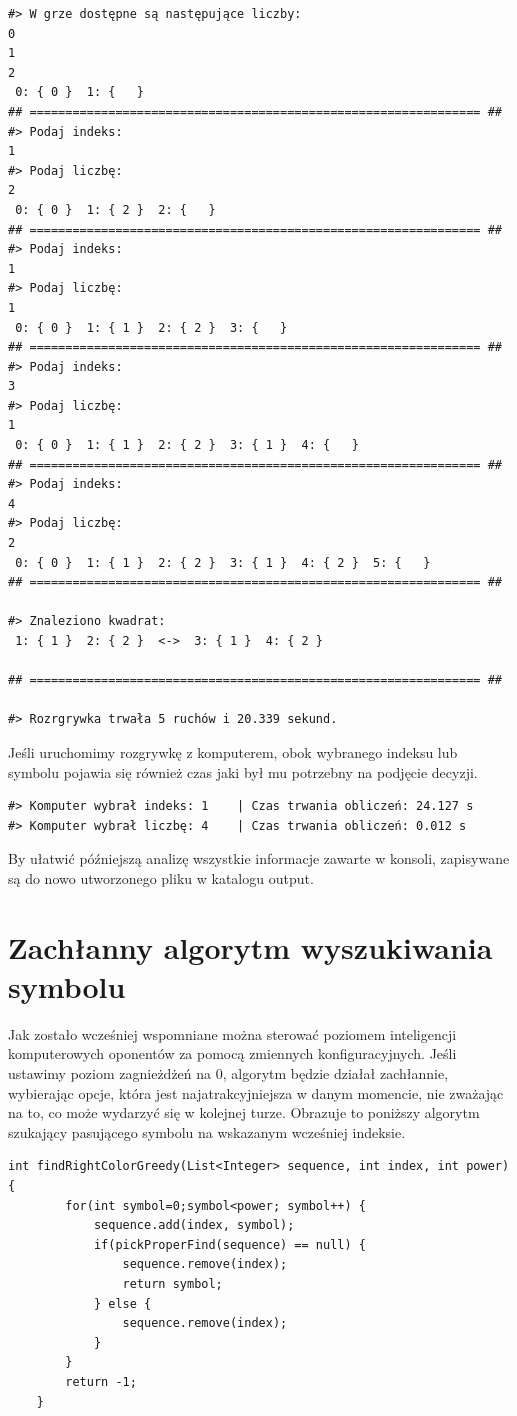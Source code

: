 \documentclass[document]{xmgr}
\begin{document}
\begin{lstlisting}
#> W grze dostępne są następujące liczby: 
0
1
2
 0: { 0 }  1: {   } 
## =============================================================== ##
#> Podaj indeks: 
1
#> Podaj liczbę: 
2
 0: { 0 }  1: { 2 }  2: {   } 
## =============================================================== ##
#> Podaj indeks: 
1
#> Podaj liczbę: 
1
 0: { 0 }  1: { 1 }  2: { 2 }  3: {   } 
## =============================================================== ##
#> Podaj indeks: 
3
#> Podaj liczbę: 
1
 0: { 0 }  1: { 1 }  2: { 2 }  3: { 1 }  4: {   } 
## =============================================================== ##
#> Podaj indeks: 
4
#> Podaj liczbę: 
2
 0: { 0 }  1: { 1 }  2: { 2 }  3: { 1 }  4: { 2 }  5: {   } 
## =============================================================== ##

#> Znaleziono kwadrat:  
 1: { 1 }  2: { 2 }  <->  3: { 1 }  4: { 2 } 

## =============================================================== ##

#> Rozrgrywka trwała 5 ruchów i 20.339 sekund.
\end{lstlisting}
Jeśli uruchomimy rozgrywkę z komputerem, obok wybranego indeksu lub symbolu pojawia się również czas jaki był mu potrzebny na podjęcie decyzji.

\begin{lstlisting}
#> Komputer wybrał indeks: 1 	| Czas trwania obliczeń: 24.127 s
#> Komputer wybrał liczbę: 4 	| Czas trwania obliczeń: 0.012 s\end{lstlisting}

By ułatwić późniejszą analizę wszystkie informacje zawarte w konsoli, zapisywane są do nowo utworzonego pliku w katalogu output.

\section{Zachłanny algorytm wyszukiwania symbolu}
Jak zostało wcześniej wspomniane można sterować poziomem inteligencji komputerowych oponentów za pomocą zmiennych konfiguracyjnych. Jeśli ustawimy poziom zagnieżdżeń na 0, algorytm będzie działał zachłannie, wybierając opcje, która jest najatrakcyjniejsza w danym momencie, nie zważając na to, co może wydarzyć się w kolejnej turze. Obrazuje to poniższy algorytm szukający pasującego symbolu na wskazanym wcześniej indeksie.

\begin{lstlisting}[frame=single]
int findRightColorGreedy(List<Integer> sequence, int index, int power) {
		for(int symbol=0;symbol<power; symbol++) {
			sequence.add(index, symbol);
			if(pickProperFind(sequence) == null) {
				sequence.remove(index);
				return symbol;
			} else {
				sequence.remove(index);
			}
		}
		return -1;
	}
\end{lstlisting}
\end{document}
